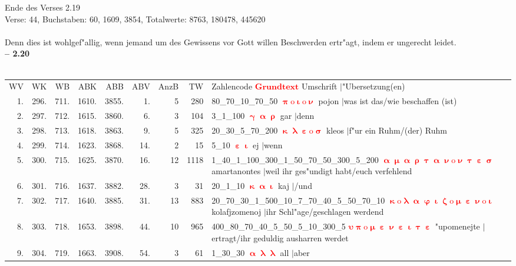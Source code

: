 \documentclass[a4paper,10pt,landscape]{article}
\begin{document}
Ende des Verses 2.19\\
Verse: 44, Buchstaben: 60, 1609, 3854, Totalwerte: 8763, 180478, 445620\\
\\
Denn dies ist wohlgef"allig, wenn jemand um des Gewissens vor Gott willen Beschwerden ertr"agt, indem er ungerecht leidet.\\
\newpage 
{\bf -- 2.20}\\
\medskip \\
\begin{tabular}{rrrrrrrrp{120mm}}
WV&WK&WB&ABK&ABB&ABV&AnzB&TW&Zahlencode \textcolor{red}{$\boldsymbol{Grundtext}$} Umschrift $|$"Ubersetzung(en)\\
1.&296.&711.&1610.&3855.&1.&5&280&80\_70\_10\_70\_50 \textcolor{red}{$\boldsymbol{\uppi\mathrm{o}\upiota\mathrm{o}\upnu}$} pojon $|$was ist das/wie beschaffen (ist)\\
2.&297.&712.&1615.&3860.&6.&3&104&3\_1\_100 \textcolor{red}{$\boldsymbol{\upgamma\upalpha\uprho}$} gar $|$denn\\
3.&298.&713.&1618.&3863.&9.&5&325&20\_30\_5\_70\_200 \textcolor{red}{$\boldsymbol{\upkappa\uplambda\upepsilon\mathrm{o}\upsigma}$} kleos $|$f"ur ein Ruhm/(der) Ruhm\\
4.&299.&714.&1623.&3868.&14.&2&15&5\_10 \textcolor{red}{$\boldsymbol{\upepsilon\upiota}$} ej $|$wenn\\
5.&300.&715.&1625.&3870.&16.&12&1118&1\_40\_1\_100\_300\_1\_50\_70\_50\_300\_5\_200 \textcolor{red}{$\boldsymbol{\upalpha\upmu\upalpha\uprho\uptau\upalpha\upnu\mathrm{o}\upnu\uptau\upepsilon\upsigma}$} amartanontes $|$weil ihr ges"undigt habt/euch verfehlend\\
6.&301.&716.&1637.&3882.&28.&3&31&20\_1\_10 \textcolor{red}{$\boldsymbol{\upkappa\upalpha\upiota}$} kaj $|$/und\\
7.&302.&717.&1640.&3885.&31.&13&883&20\_70\_30\_1\_500\_10\_7\_70\_40\_5\_50\_70\_10 \textcolor{red}{$\boldsymbol{\upkappa\mathrm{o}\uplambda\upalpha\upvarphi\upiota\upzeta\mathrm{o}\upmu\upepsilon\upnu\mathrm{o}\upiota}$} kolafjzomenoj $|$ihr Schl"age/geschlagen werdend\\
8.&303.&718.&1653.&3898.&44.&10&965&400\_80\_70\_40\_5\_50\_5\_10\_300\_5 \textcolor{red}{$\boldsymbol{\upsilon\uppi\mathrm{o}\upmu\upepsilon\upnu\upepsilon\upiota\uptau\upepsilon}$} "upomenejte $|$ertragt/ihr geduldig ausharren werdet\\
9.&304.&719.&1663.&3908.&54.&3&61&1\_30\_30 \textcolor{red}{$\boldsymbol{\upalpha\uplambda\uplambda}$} all $|$aber\\

\end{tabular}
\end{document}
